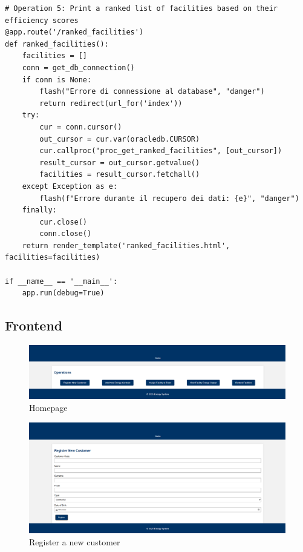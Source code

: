 \begin{lstlisting}
# Operation 5: Print a ranked list of facilities based on their efficiency scores
@app.route('/ranked_facilities')
def ranked_facilities():
    facilities = []
    conn = get_db_connection()
    if conn is None:
        flash("Errore di connessione al database", "danger")
        return redirect(url_for('index'))
    try:
        cur = conn.cursor()
        out_cursor = cur.var(oracledb.CURSOR)
        cur.callproc("proc_get_ranked_facilities", [out_cursor])
        result_cursor = out_cursor.getvalue()
        facilities = result_cursor.fetchall()
    except Exception as e:
        flash(f"Errore durante il recupero dei dati: {e}", "danger")
    finally:
        cur.close()
        conn.close()
    return render_template('ranked_facilities.html', facilities=facilities)

if __name__ == '__main__':
    app.run(debug=True)
\end{lstlisting}

\subsection{Frontend}

\begin{figure}[H]
    \centering
    \includegraphics[width=\textwidth]{images/homepage.png}
    \caption{Homepage}
\end{figure}

\begin{figure}[H]
    \centering
    \includegraphics[width=\textwidth]{images/Op1.png}
    \caption{Register a new customer}
\end{figure}


